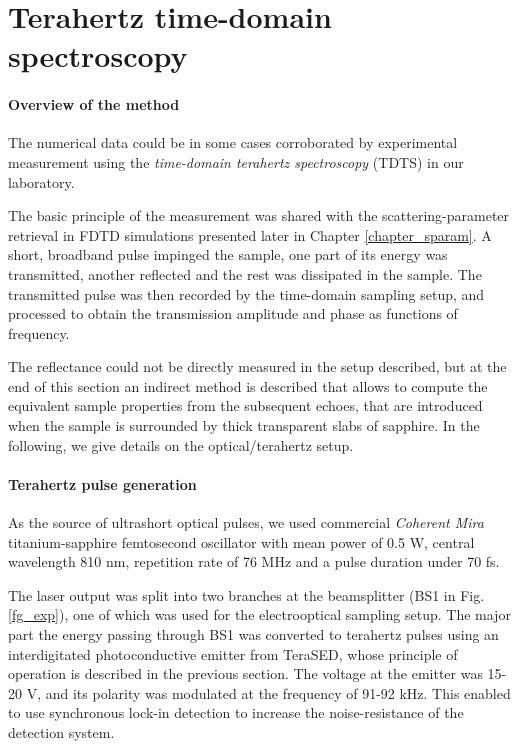 
\section{Terahertz time-domain spectroscopy} \label{sect_tdts} 
\paragraph{Overview of the method}%
The numerical data could be in some cases corroborated by experimental measurement using the \textit{time-domain terahertz spectroscopy} (TDTS) in our laboratory. 

The basic principle of the measurement was shared with the scattering-parameter retrieval in FDTD simulations presented later in Chapter \ref{chapter_sparam}.
 A short, broadband pulse impinged the sample, one part of its energy was transmitted, another reflected and the rest was dissipated in the sample. The transmitted pulse was then recorded by the time-domain sampling setup, and processed to obtain the transmission amplitude and phase as functions of frequency.

The reflectance could not be directly measured in the setup described, but at the end of this section an indirect method is described that allows to compute the equivalent sample properties from the subsequent echoes, that are introduced when the sample is surrounded by thick transparent slabs of sapphire. 
In the following, we give details on the optical/terahertz setup.
\paragraph{Terahertz pulse generation}%
As the source of ultrashort optical pulses, we used commercial \textit{Coherent Mira} titanium-sapphire femtosecond oscillator with mean power of 0.5 W, central wavelength 810 nm, repetition rate of 76 MHz and a pulse duration under 70 fs.  %

The laser output was split into two branches at the beamsplitter (BS1 in Fig. \ref{fg_exp}), one of which was used for the electrooptical sampling setup. The major part the energy passing through BS1 was converted to terahertz pulses using an interdigitated photoconductive emitter from TeraSED, whose principle of operation is described in the previous section. 
The voltage at the emitter was 15-20 V, and its polarity was modulated at the frequency of 91-92 kHz. This enabled to use synchronous lock-in detection to increase the noise-resistance of the detection system. %

